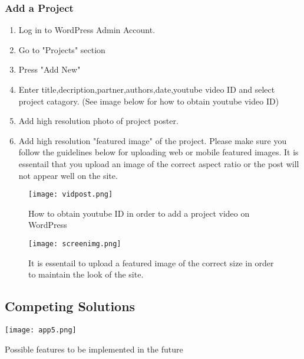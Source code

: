 \subsubsection{Add a Project}
\begin{enumerate}

  \item Log in to WordPress Admin Account.
  \item Go to "Projects" section
  \item Press "Add New"
  \item Enter title,decription,partner,authors,date,youtube video ID and select project catagory. (See image below for how to obtain youtube video ID)
  \item Add high resolution photo of project poster.
  \item Add high resolution "featured image" of the project. Please make sure you follow the guidelines below for uploading web or mobile featured images. It is essentail that you upload an image of the correct aspect ratio or the post will not appear well on the site.

\end{enumerate}

 \begin{figure}[H]
      \centering
      \texttt{[image: vidpost.png]}
      \caption{How to obtain youtube ID in order to add a project video on WordPress}
 \end{figure}

  \begin{figure}[H]
      \centering
      \texttt{[image: screenimg.png]}
      \caption{It is essentail to upload a featured image of the correct size in order to maintain the look of the site.}
 \end{figure}

\begin{landscape}
\subsection{Competing Solutions}
  \begin{table}[H]
      \centering
      \texttt{[image: app5.png]}
      \caption{Possible features to be implemented in the future}
 \end{table}
 \end{landscape}

 \newpage


